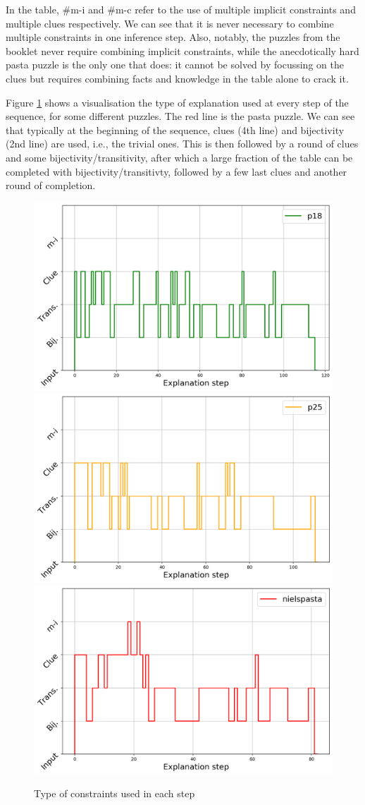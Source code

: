 In the table, \#m-i and \#m-c refer to the use of multiple implicit constraints and multiple clues respectively. We can see that it is never necessary to combine multiple constraints in one inference step. Also, notably, the puzzles from the booklet never require combining implicit constraints, while the anecdotically hard pasta puzzle is the only one that does: it cannot be solved by focussing on the clues but requires combining facts and knowledge in the table alone to crack it.


 Figure \ref{fig:steps} shows a visualisation the type of explanation used at every step of the sequence, for some different puzzles. The red line is the pasta puzzle. We can see that typically at the beginning of the sequence, clues (4th line) and bijectivity (2nd line) are used, i.e., the trivial ones. This is then followed by a round of clues and some bijectivity/transitivity, after which a large fraction of the table can be completed with bijectivity/transitivty, followed by a few last clues and another round of completion.\setlength{\parskip}{0pt}

\begin{figure}[t]
\centering
\includegraphics[width=0.32\linewidth]{figures/plot_cost_steps_p18}
\includegraphics[width=0.32\linewidth]{figures/plot_cost_steps_p25}
\includegraphics[width=0.32\linewidth]{figures/plot_cost_steps_nielspasta}\caption{Type of constraints used in each step}
\label{fig:steps}
\end{figure}

